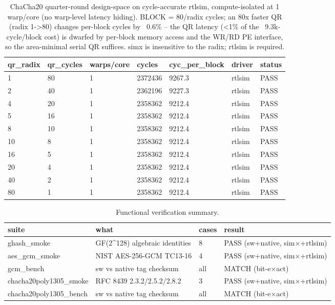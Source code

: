 \begin{table}[t]
\centering
\caption{ChaCha20 quarter-round design-space on cycle-accurate rtlsim, compute-isolated at 1 warp/core (no warp-level latency hiding). BLOCK = 80/radix cycles; an 80x faster QR (radix 1->80) changes per-block cycles by ~0.6\% -- the QR latency (<1\% of the ~9.3k-cycle/block cost) is dwarfed by per-block memory access and the WR/RD PE interface, so the area-minimal serial QR suffices. simx is insensitive to the radix; rtlsim is required.}
\label{tab:chacha_design_space}
\begin{tabular}{lllllll}
\toprule
qr\_radix & qr\_cycles & warps/core & cycles & cyc\_per\_block & driver & status \\
\midrule
1 & 80 & 1 & 2372436 & 9267.3 & rtlsim & PASS \\
2 & 40 & 1 & 2362196 & 9227.3 & rtlsim & PASS \\
4 & 20 & 1 & 2358362 & 9212.4 & rtlsim & PASS \\
5 & 16 & 1 & 2358362 & 9212.4 & rtlsim & PASS \\
8 & 10 & 1 & 2358362 & 9212.4 & rtlsim & PASS \\
10 & 8 & 1 & 2358362 & 9212.4 & rtlsim & PASS \\
16 & 5 & 1 & 2358362 & 9212.4 & rtlsim & PASS \\
20 & 4 & 1 & 2358362 & 9212.4 & rtlsim & PASS \\
40 & 2 & 1 & 2358362 & 9212.4 & rtlsim & PASS \\
80 & 1 & 1 & 2358362 & 9212.4 & rtlsim & PASS \\
\bottomrule
\end{tabular}
\end{table}

\begin{table}[t]
\centering
\caption{Functional verification summary.}
\label{tab:correctness}
\begin{tabular}{llll}
\toprule
suite & what & cases & result \\
\midrule
ghash\_smoke & GF(2^128) algebraic identities & 8 & PASS (sw+native, sim$\times$+rtlsim) \\
aes\_gcm\_smoke & NIST AES-256-GCM TC13-16 & 4 & PASS (sw+native, sim$\times$+rtlsim) \\
gcm\_bench & sw vs native tag checksum & all & MATCH (bit-e$\times$act) \\
chacha20poly1305\_smoke & RFC 8439 2.3.2/2.5.2/2.8.2 & 3 & PASS (sw+native, sim$\times$+rtlsim) \\
chacha20poly1305\_bench & sw vs native tag checksum & all & MATCH (bit-e$\times$act) \\
\bottomrule
\end{tabular}
\end{table}
